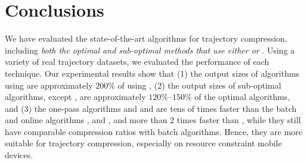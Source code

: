 \vspace{-1ex}
\section{Conclusions}

We have evaluated the state-of-the-art \lsa algorithms for trajectory compression, including \emph{both the optimal and sub-optimal methods that use either \ped or \sed}. 
Using a variety of real trajectory datasets, we evaluated the performance of each technique. %
Our experimental results show that 
(1) the output sizes of algorithms using \sed are approximately $200\%$ of using \ped, 
(2) the output sizes of sub-optimal algorithms, except \squishe, are approximately $120\%$--$150\%$ of the optimal algorithms, and 
(3) the one-pass algorithms \siped and \operb and \cised are tens of times faster than the batch and online algorithms \tpa, \dpa and \bqsa, and more than $2$ times faster than \squishe, while they still have comparable compression ratios with batch algorithms. Hence, they are more suitable for trajectory compression, especially on resource constraint mobile devices.